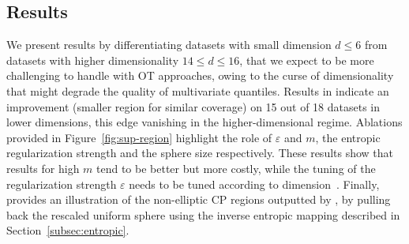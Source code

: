 \subsection{Results}
We present results by differentiating datasets with small dimension $d\leq 6$ from datasets with higher dimensionality $14\leq d\leq 16$, that we expect to be more challenging to handle with OT approaches, owing to the curse of dimensionality that might degrade the quality of multivariate quantiles. Results in  indicate an improvement (smaller region for similar coverage) on 15 out of 18 datasets in lower dimensions, this edge vanishing in the higher-dimensional regime. Ablations provided in Figure~\ref{fig:sup-region} highlight the role of $\varepsilon$ and $m$, the entropic regularization strength and the sphere size respectively. These results show that results for high $m$ tend to be better but more costly, while the tuning of the regularization strength $\varepsilon$ needs to be tuned according to dimension~\citep{vacher2022parameter}. Finally,  provides an illustration of the non-elliptic CP regions outputted by \OTCP, by pulling back the rescaled uniform sphere using the inverse entropic mapping described in Section~\ref{subsec:entropic}.



















































